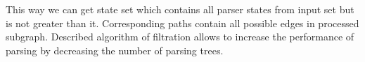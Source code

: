 This way we can get state set which contains all parser states from input set but is not greater 
than it. Corresponding paths contain all possible edges in processed subgraph. Described algorithm
of filtration allows to increase the performance of parsing by decreasing the number of parsing trees.
